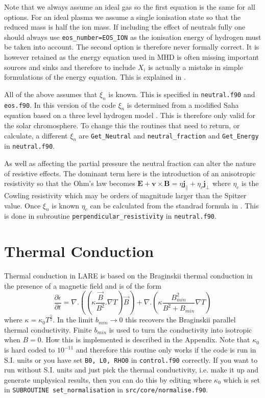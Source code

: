 \documentclass[11pt]{article}
\begin{document}
Note that we always assume an ideal gas so the first equation is the same for all options. For an ideal plasma we assume a single ionisation state so that the reduced mass is half the ion mass. If including the effect of neutrals fully one should always use \texttt{eos\_number=EOS\_ION} as the ionisation energy of hydrogen must be taken into account. The second option is therefore never formally correct. It is however retained as the energy equation used in MHD is often missing important sources and sinks and therefore to include $X_i$ is actually a mistake in simple formulations of the energy equation. This is explained in \cite{flux-emergence}.

All of the above assumes that $\xi_n$ is known. This is specified in \texttt{neutral.f90} and \texttt{eos.f90}. In this version of the code $\xi_n$ is determined from a modified Saha equation based on a three level hydrogen model \cite{brown}. This is therefore only valid for the solar chromosphere. To change this the routines that need to return, or calculate, a different $\xi_n$ are \texttt{Get\_Neutral} and \texttt{neutral\_fraction} and \texttt{Get\_Energy} in \texttt{neutral.f90}.

As well as affecting the partial pressure the neutral fraction can alter the nature of resistive effects. The dominant term here is the introduction of an anisotropic resistivity so that the Ohm's law becomes 
$\mathbf{E}+\mathbf{v}\times\mathbf{B}=\eta \mathbf{j_{\parallel}} + \eta_c \mathbf{j_{\perp}}$ 
where $\eta_c$ is the Cowling resistivity which may be orders of magnitude larger than the Spitzer value. Once $\xi_n$ is known $\eta_c$ can be calculated from the standrad formula in \cite{flux-emergence}. This is done in subroutine \texttt{perpendicular\_resistivity} in \texttt{neutral.f90}. 

\section{Thermal Conduction} %
\label{sec:thermal_conduction}
Thermal conduction in LARE is based on the Braginskii thermal conduction in the presence of a magnetic field and is of the form\\
\[
\frac{\partial \epsilon}{\partial t} = \nabla . \left(\left(\kappa \frac{\vec{B}}{B^2}. \nabla T\right) \vec{B} \right) +  \nabla . \left(\kappa  \frac{B_{min}^2}{B^2+B_{min}}  \nabla T \right)
\]
where $\kappa = \kappa_0  T^\frac{5}{2}$. In the limit $b_{min}\to 0$ this recovers the Braginskii parallel thermal conductivity. Finite $b_{min}$ is used to turn the conductivity into isotropic when $B=0$.  How this is implemented is described in the Appendix. Note that $\kappa_0$ is hard coded to $10^{-11}$ and therefore this routine only works if the code is run in S.I. units or you have set {\tt B0, L0, RHO0} in {\tt control.f90} correctly. If you want to run without S.I. units and just pick the thermal conductivity, i.e. make it up and generate unphysical results, then you can do this by editing where $\kappa_0$ which is set in {\tt SUBROUTINE set\_normalisation} in {\tt src/core/normalise.f90}.    
\end{document}
